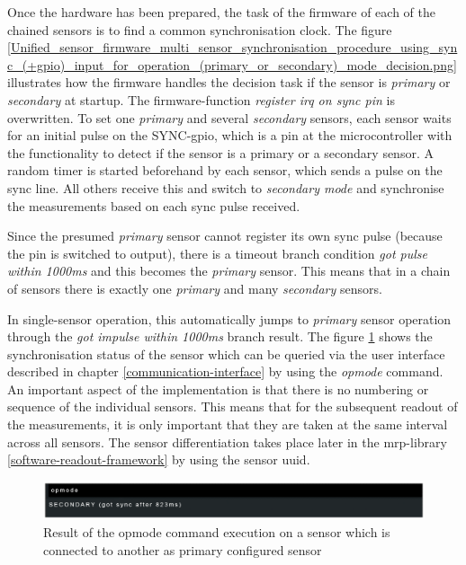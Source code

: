 Once the hardware has been prepared, the task of the firmware of each of
the chained sensors is to find a common synchronisation clock. The
figure
\ref{Unified_sensor_firmware_multi_sensor_synchronisation_procedure_using_sync_(+gpio)_input_for_operation_(primary_or_secondary)_mode_decision.png}
illustrates how the firmware handles the decision task if the sensor is
\emph{primary} or \emph{secondary} at startup. The firmware-function
\emph{register irq on sync pin} is overwritten. To set one
\emph{primary} and several \emph{secondary} sensors, each sensor waits
for an initial pulse on the SYNC-\gls{gpio}, which is a pin at the
microcontroller with the functionality to detect if the sensor is a
primary or a secondary sensor. A random timer is started beforehand by
each sensor, which sends a pulse on the sync line. All others receive
this and switch to \emph{secondary mode} and synchronise the
measurements based on each sync pulse received.

Since the presumed \emph{primary} sensor cannot register its own sync
pulse (because the pin is switched to output), there is a timeout branch
condition \emph{got pulse within 1000ms} and this becomes the
\emph{primary} sensor. This means that in a chain of sensors there is
exactly one \emph{primary} and many \emph{secondary} sensors.

In single-sensor operation, this automatically jumps to \emph{primary}
sensor operation through the \emph{got impulse within 1000ms} branch
result. The figure
\ref{Result_of_the_opmode_command_execution_on_a_sensor_which_is_connected_to_another_as_primary_configured_sensor.png}
shows the synchronisation status of the sensor which can be queried via
the user interface described in chapter \ref{communication-interface} by
using the \emph{opmode} command. An important aspect of the
implementation is that there is no numbering or sequence of the
individual sensors. This means that for the subsequent readout of the
measurements, it is only important that they are taken at the same
interval across all sensors. The sensor differentiation takes place
later in the \gls{mrp}-library \ref{software-readout-framework} by using
the sensor \gls{uuid}.

\begin{figure}
\centering
\includegraphics{./generated_images/border_Result_of_the_opmode_command_execution_on_a_sensor_which_is_connected_to_another_as_primary_configured_sensor.png}
\caption{Result of the opmode command execution on a sensor which is
connected to another as primary configured sensor
\label{Result_of_the_opmode_command_execution_on_a_sensor_which_is_connected_to_another_as_primary_configured_sensor.png}}
\end{figure}

